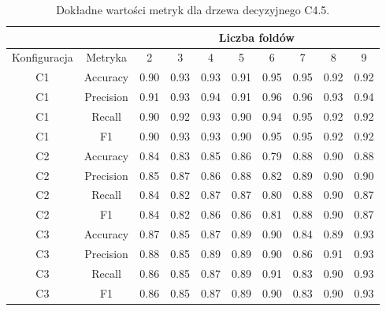 \begin{table}[H]
  \center
\begin{tabular}{|c|c|c|c|c|c|c|c|c|c|}  \hline
  \multicolumn{2}{|c|}{} & \multicolumn{8}{c|}{Liczba foldów} \\ \hline
Konfiguracja &    Metryka &     2 &     3 &     4 &     5 &     6 &     7 &     8 &     9 \\ \hline
          C1 &   Accuracy &  0.90 &  0.93 &  0.93 &  0.91 &  0.95 &  0.95 &  0.92 &  0.92 \\ \hline
          C1 &  Precision &  0.91 &  0.93 &  0.94 &  0.91 &  0.96 &  0.96 &  0.93 &  0.94 \\ \hline
          C1 &     Recall &  0.90 &  0.92 &  0.93 &  0.90 &  0.94 &  0.95 &  0.92 &  0.92 \\ \hline
          C1 &         F1 &  0.90 &  0.93 &  0.93 &  0.90 &  0.95 &  0.95 &  0.92 &  0.92 \\ \hline \hline
          C2 &   Accuracy &  0.84 &  0.83 &  0.85 &  0.86 &  0.79 &  0.88 &  0.90 &  0.88 \\ \hline
          C2 &  Precision &  0.85 &  0.87 &  0.86 &  0.88 &  0.82 &  0.89 &  0.90 &  0.90 \\ \hline
          C2 &     Recall &  0.84 &  0.82 &  0.87 &  0.87 &  0.80 &  0.88 &  0.90 &  0.87 \\ \hline
          C2 &         F1 &  0.84 &  0.82 &  0.86 &  0.86 &  0.81 &  0.88 &  0.90 &  0.87 \\ \hline \hline
          C3 &   Accuracy &  0.87 &  0.85 &  0.87 &  0.89 &  0.90 &  0.84 &  0.89 &  0.93 \\ \hline
          C3 &  Precision &  0.88 &  0.85 &  0.89 &  0.89 &  0.90 &  0.86 &  0.91 &  0.93 \\ \hline
          C3 &     Recall &  0.86 &  0.85 &  0.87 &  0.89 &  0.91 &  0.83 &  0.90 &  0.93 \\ \hline
          C3 &         F1 &  0.86 &  0.85 &  0.87 &  0.89 &  0.90 &  0.83 &  0.90 &  0.93 \\ \hline
\end{tabular}


  \caption{Dokładne wartości metryk dla drzewa decyzyjnego C4.5.}
\end{table}
